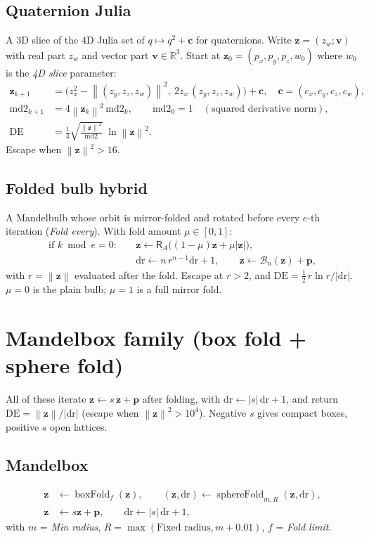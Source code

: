\documentclass[10pt,a4paper]{article}
\newcommand{\R}{\mathbb{R}}
\newcommand{\vv}[1]{\mathbf{#1}}
\newcommand{\abs}[1]{\left|#1\right|}
\newcommand{\norm}[1]{\left\lVert#1\right\rVert}
\newcommand{\Rot}{\mathsf{R}}
\newcommand{\DE}{\mathrm{DE}}
\newcommand{\sfold}{\operatorname{sphereFold}}
\newcommand{\bfold}{\operatorname{boxFold}}
\begin{document}
\subsection{Quaternion Julia}
A 3D slice of the 4D Julia set of $q\mapsto q^2+\vv c$ for quaternions. Write $\vv z=(z_w; \vv v)$ with real part $z_w$ and vector part $\vv v\in\R^3$.
Start at $\vv z_0=(p_x,p_y,p_z,w_0)$ where $w_0$ is the \emph{4D slice} parameter:
\begin{align}
\vv z_{k+1}&=\big(z_x^2-\norm{(z_y,z_z,z_w)}^2,\ 2z_x\,(z_y,z_z,z_w)\big)+\vv c,\quad \vv c=(c_x,c_y,c_z,c_w),\\
\mathrm{md2}_{k+1}&=4\norm{\vv z_k}^2\,\mathrm{md2}_k,\qquad\mathrm{md2}_0=1\quad(\text{squared derivative norm}),\\
\DE&=\tfrac14\sqrt{\frac{\norm{\vv z}^2}{\mathrm{md2}}}\;\ln\norm{\vv z}^2.
\end{align}
Escape when $\norm{\vv z}^2>16$.


\subsection{Folded bulb hybrid}
A Mandelbulb whose orbit is mirror-folded and rotated before every $e$-th iteration (\emph{Fold every}). With fold amount $\mu\in[0,1]$:
\begin{align}
\text{if } k\bmod e=0:&\quad \vv z\leftarrow\Rot_A\big((1-\mu)\vv z+\mu\abs{\vv z}\big),\\
&\quad \mathrm{dr}\leftarrow n\,r^{n-1}\mathrm{dr}+1,\qquad \vv z\leftarrow\mathcal B_n(\vv z)+\vv p,
\end{align}
with $r=\norm{\vv z}$ evaluated after the fold. Escape at $r>2$, and $\DE=\tfrac12\,r\ln r/\abs{\mathrm{dr}}$.
$\mu=0$ is the plain bulb; $\mu=1$ is a full mirror fold.


\section{Mandelbox family (box fold + sphere fold)}
All of these iterate $\vv z\leftarrow s\,\vv z+\vv p$ after folding, with $\mathrm{dr}\leftarrow\abs s\,\mathrm{dr}+1$, and
return $\DE=\norm{\vv z}/\abs{\mathrm{dr}}$ (escape when $\norm{\vv z}^2>10^4$). Negative $s$ gives compact boxes, positive $s$ open lattices.

\subsection{Mandelbox}
\begin{align}
\vv z&\leftarrow\bfold_f(\vv z),\qquad (\vv z,\mathrm{dr})\leftarrow\sfold_{m,R}(\vv z,\mathrm{dr}),\\
\vv z&\leftarrow s\vv z+\vv p,\qquad\mathrm{dr}\leftarrow\abs s\,\mathrm{dr}+1,
\end{align}
with $m$ = \emph{Min radius}, $R=\max(\text{Fixed radius},m+0.01)$, $f$ = \emph{Fold limit}.

\end{document}
